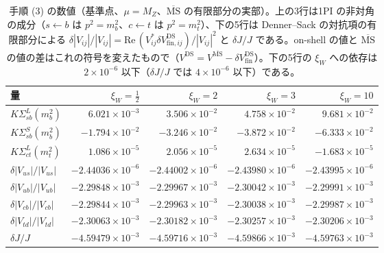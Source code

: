 \documentclass[a4paper,10pt]{ltjsarticle}
\newcommand{\MSbar}{\overline{\mathrm{MS}}}
\newcommand{\re}{\mathrm{Re}\,}
\begin{document}
\begin{table}[tbp]
\centering\small
\caption{手順 (3) の数値（基準点、$\mu=M_Z$、$\MSbar$ の有限部分の実部）。上の3行は1PI の非対角の成分（$s\leftarrow b$ は $p^2=m_b^2$、$c\leftarrow t$ は $p^2=m_t^2$）、下の5行は Denner--Sack の対抗項の有限部分による $\delta|V_{ij}|/|V_{ij}|=\re(V_{ij}^*\delta V^{\mathrm{DS}}_{\mathrm{fin},ij})/|V_{ij}|^2$ と $\delta J/J$ である。on-shell の値と $\MSbar$ の値の差はこれの符号を変えたもので（$V^{\mathrm{DS}}=V^{\MSbar}-\delta V^{\mathrm{DS}}_{\mathrm{fin}}$）。下の5行の $\xi_W$ への依存は $2\times10^{-6}$ 以下（$\delta J/J$ では $4\times10^{-6}$ 以下）である。}
\label{tab:ckmct}
\begin{tabular}{lrrrr}
\toprule
量 & $\xi_W=\frac12$ & $\xi_W=2$ & $\xi_W=3$ & $\xi_W=10$ \\
\midrule
$K\Sigma^L_{sb}(m_b^2)$ & $6.021\times10^{-3}$ & $3.506\times10^{-2}$ & $4.758\times10^{-2}$ & $9.681\times10^{-2}$ \\
$K\Sigma^S_{sb}(m_b^2)$ & $-1.794\times10^{-2}$ & $-3.246\times10^{-2}$ & $-3.872\times10^{-2}$ & $-6.333\times10^{-2}$ \\
$K\Sigma^L_{ct}(m_t^2)$ & $1.086\times10^{-5}$ & $2.056\times10^{-5}$ & $2.634\times10^{-5}$ & $-1.683\times10^{-5}$ \\
\midrule
$\delta|V_{us}|/|V_{us}|$ & $-2.44036\times10^{-6}$ & $-2.44002\times10^{-6}$ & $-2.43980\times10^{-6}$ & $-2.43995\times10^{-6}$ \\
$\delta|V_{ub}|/|V_{ub}|$ & $-2.29848\times10^{-3}$ & $-2.29967\times10^{-3}$ & $-2.30042\times10^{-3}$ & $-2.29991\times10^{-3}$ \\
$\delta|V_{cb}|/|V_{cb}|$ & $-2.29844\times10^{-3}$ & $-2.29963\times10^{-3}$ & $-2.30038\times10^{-3}$ & $-2.29987\times10^{-3}$ \\
$\delta|V_{td}|/|V_{td}|$ & $-2.30063\times10^{-3}$ & $-2.30182\times10^{-3}$ & $-2.30257\times10^{-3}$ & $-2.30206\times10^{-3}$ \\
$\delta J/J$ & $-4.59479\times10^{-3}$ & $-4.59716\times10^{-3}$ & $-4.59866\times10^{-3}$ & $-4.59763\times10^{-3}$ \\
\bottomrule
\end{tabular}
\end{table}
\end{document}
